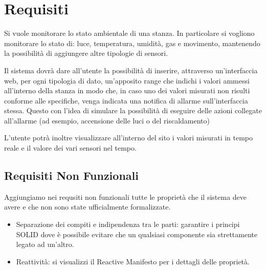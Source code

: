 \section{Requisiti}

Si vuole monitorare lo stato ambientale di una stanza. In particolare si vogliono monitorare lo stato di: luce, temperatura, umidit\`a, gas e movimento, mantenendo la possibilit\`a di aggiungere altre tipologie di sensori.

Il sistema dovr\`a dare all'utente la possibilit\`a di inserire, attraverso un'interfaccia web, per ogni tipologia di dato, un'apposito range che indichi i valori ammessi all'interno della stanza in modo che, in caso uno dei valori misurati non risulti conforme alle specifiche, venga indicata una notifica di allarme sull'interfaccia stessa. Questo con l'idea di simulare la possibilit\`a di eseguire delle azioni collegate all'allarme (ad esempio, accensione delle luci o del riscaldamento)

L'utente potr\`a inoltre visualizzare all'interno del sito i valori misurati in tempo reale e il valore dei vari sensori nel tempo.

\subsection{Requisiti Non Funzionali}

Aggiungiamo nei requsiti non funzionali tutte le propriet\`a che il sistema deve avere e che non sono state ufficialmente formalizzate.

\begin{itemize}
  \item Separazione dei compiti e indipendenza tra le parti: garantire i principi SOLID dove \`e possibile evitare che un qualsiasi componente sia strettamente legato ad un'altro.
  \item Reattivit\`a: si visualizzi il Reactive Manifesto per i dettagli delle propriet\`a.
\end{itemize}
